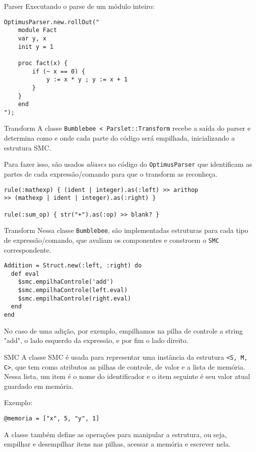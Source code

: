 \documentclass{beamer}
\begin{document}
\begin{frame}[fragile]{Parser}
Executando o parse de um módulo inteiro:
\begin{verbatim}
OptimusParser.new.rollOut("
    module Fact
    var y, x
    init y = 1 

    proc fact(x) {
        if (~ x == 0) {
            y := x * y ; y := x + 1
        } 
    }
    end
");
\end{verbatim}

\end{frame}

\begin{frame}[fragile]{Transform}
A classe \verb|Bumblebee < Parslet::Transform| recebe a saída do parser e determina como e onde cada parte do código será empilhada, inicializando a estrutura SMC.

Para fazer isso, são usados \textit{aliases} no código do \verb|OptimusParser| que identificam as partes de cada expressão/comando para que o transform as reconheça.

\begin{verbatim}
rule(:mathexp) { (ident | integer).as(:left) >> arithop
>> (mathexp | ident | integer).as(:right) }

rule(:sum_op) { str("+").as(:op) >> blank? }

\end{verbatim}

\end{frame}

\begin{frame}[fragile]{Transform}
Nessa classe \verb|Bumblebee|, são implementadas estruturas para cada tipo de expressão/comando, que avaliam os componentes e constroem o \verb|SMC| correspondente.

\begin{verbatim}
Addition = Struct.new(:left, :right) do
  def eval
    $smc.empilhaControle('add')
    $smc.empilhaControle(left.eval)
    $smc.empilhaControle(right.eval)
  end
end
\end{verbatim}
No caso de uma adição, por exemplo, empilhamos na pilha de controle a string "add", o lado esquerdo da expressão, e por fim o lado direito.

\end{frame}

\begin{frame}[fragile]{SMC}
A classe SMC é usada para representar uma instância da estrutura \verb|<S, M, C>|, que tem como atributos as pilhas de controle, de valor e a lista de memória. Nessa lista, um item é o nome do identificador e o item seguinte é seu valor atual guardado em memória.

Exemplo:
\begin{verbatim}
@memoria = ["x", 5, "y", 1]
\end{verbatim}

A classe também define as operações para manipular a estrutura, ou seja, empilhar e desempilhar itens nas pilhas, acessar a memória e escrever nela.

\end{frame}
\end{document}
